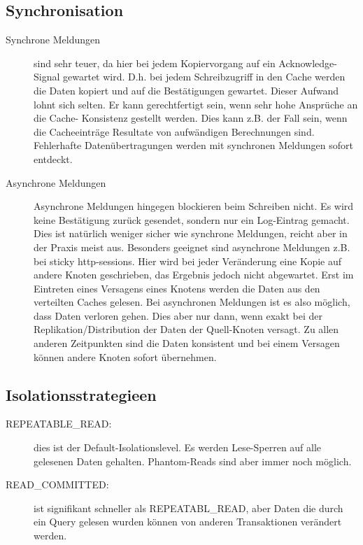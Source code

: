 \documentclass[a4paper,10pt]{scrreprt}
\begin{document}
\subsection{Synchronisation} %
\label{sub:synchronisation}
\begin{description}
	\item[Synchrone Meldungen] sind sehr teuer, da hier bei jedem Kopiervorgang auf ein Acknowledge-Signal gewartet
wird. D.h. bei jedem Schreibzugriff in den Cache werden die Daten kopiert und auf die Bestätigungen gewartet.
Dieser Aufwand lohnt sich selten. Er kann gerechtfertigt sein, wenn sehr hohe Ansprüche an die Cache-
Konsistenz gestellt werden. Dies kann z.B. der Fall sein, wenn die Cacheeinträge Resultate von aufwändigen
Berechnungen sind. Fehlerhafte Datenübertragungen werden mit synchronen Meldungen sofort entdeckt.
\item[Asynchrone Meldungen] Asynchrone Meldungen hingegen blockieren beim Schreiben nicht. Es wird keine Bestätigung zurück gesendet,
sondern nur ein Log-Eintrag gemacht. Dies ist natürlich weniger sicher wie synchrone Meldungen, reicht aber in
der Praxis meist aus. Besonders geeignet sind asynchrone Meldungen z.B. bei sticky http-sessions. Hier wird bei
jeder Veränderung eine Kopie auf andere Knoten geschrieben, das Ergebnis jedoch nicht abgewartet. Erst im
Eintreten eines Versagens eines Knotens werden die Daten aus den verteilten Caches gelesen. Bei asynchronen
Meldungen ist es also möglich, dass Daten verloren gehen. Dies aber nur dann, wenn exakt bei der
Replikation/Distribution der Daten der Quell-Knoten versagt. Zu allen anderen Zeitpunkten sind die Daten
konsistent und bei einem Versagen können andere Knoten sofort übernehmen.

\end{description}
\subsection{Isolationsstrategieen} %
\label{sub:isolationsstrategieen}
\begin{description}
	\item[REPEATABLE\_READ:] dies ist der Default-Isolationslevel. Es werden Lese-Sperren auf alle gelesenen Daten
gehalten. Phantom-Reads sind aber immer noch möglich.
\item[READ\_COMMITTED:]  ist signifikant schneller als REPEATABL\_READ, aber Daten die durch ein Query gelesen
wurden können von anderen Transaktionen verändert werden.
 
\end{description}
\end{document}
